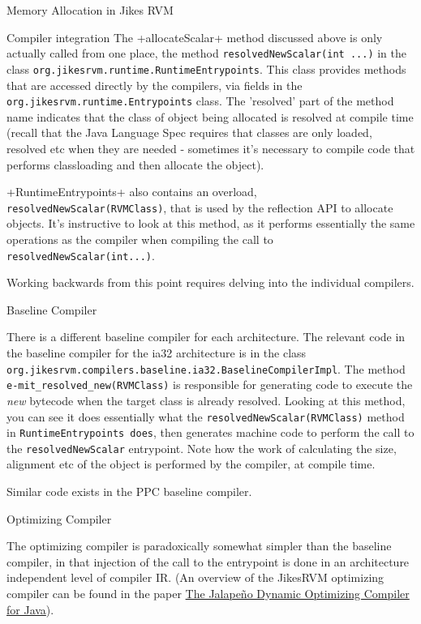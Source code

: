 \begin{section}{Memory Allocation in Jikes RVM}
\begin{subsection}{Compiler integration}
The \spverb+allocateScalar+ method discussed above is only actually called from one place, the method \texttt{re\-sol\-ved\-New\-Sca\-lar(int ...)} in the class \texttt{org.jikes\-rvm.run\-ti\-me.Run\-ti\-me\-En\-try\-points}.  This class provides methods that are accessed directly by the compilers, via fields in the \texttt{org.jikes\-rvm.run\-ti\-me.En\-try\-points} class.  The 'resolved' part of the method name indicates that the class of object being allocated is resolved at compile time (recall that the Java Language Spec requires that classes are only loaded, resolved etc when they are needed - sometimes it's necessary to compile code that performs classloading and then allocate the object).

\spverb+RuntimeEntrypoints+ also contains an overload, \texttt{re\-sol\-ved\-New\-Sca\-lar(RVM\-Class)}, that is used by the reflection API to allocate objects.  It's instructive to look at this method, as it performs essentially the same operations as the compiler when compiling the call to \texttt{re\-sol\-ved\-New\-Sca\-lar(int...)}.

Working backwards from this point requires delving into the individual compilers.

\begin{subsubsection}{Baseline Compiler}

There is a different baseline compiler for each architecture.  The relevant code in the baseline compiler for the ia32 architecture is in the class \texttt{org.jikes\-rvm.com\-pi\-lers.ba\-se\-li\-ne.ia32.Ba\-se\-li\-ne\-Com\-pi\-ler\-Impl}.  The method \texttt{e-mit\_re\-sol\-ved\_new(RVM\-Class)} is responsible for generating code to execute the \textit{new} bytecode when the target class is already resolved.  Looking at this method, you can see it does essentially what the \texttt{re\-sol\-ved\-New\-Sca\-lar(RVMClass)} method in \texttt{RuntimeEntrypoints does}, then generates machine code to perform the call to the \texttt{resolvedNewScalar} entrypoint.  Note how the work of calculating the size, alignment etc of the object is performed by the compiler, at compile time.

Similar code exists in the PPC baseline compiler.

\end{subsubsection}

\begin{subsubsection}{Optimizing Compiler}

The optimizing compiler is paradoxically somewhat simpler than the baseline compiler, in that injection of the call to the entrypoint is done in an architecture independent level of compiler IR.  (An overview of the JikesRVM optimizing compiler can be found in the paper \href{http://suif.stanford.edu/~jwhaley/papers/javagrande99.pdf}{The Jalapeño Dynamic Optimizing Compiler for Java}).


\end{subsubsection}
\end{subsection}
\end{section}
